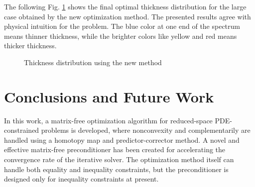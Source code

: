 \documentclass{article}
\theoremstyle{definition}
\begin{document}
The following Fig. \ref{fig:thick} shows the final optimal thickness distribution for the large case obtained by the new optimization method. The presented results agree with physical intuition for the problem. The blue color at one end of the spectrum means thinner thickness, while the brighter colors like yellow and red means thicker thickness.   

\begin{figure}[H]
\centering




\caption{Thickness distribution using the new method}
\label{fig:thick}
\end{figure}

\section{Conclusions and Future Work}
In this work, a matrix-free optimization algorithm for reduced-space PDE-constrained problems is developed, where nonconvexity and complementarily are handled using a homotopy map and predictor-corrector method. A novel and effective matrix-free preconditioner has been created for accelerating the convergence rate of the iterative solver. The optimization method itself can handle both equality and inequality constraints, but the preconditioner is designed only for inequality constraints at present. 
\end{document}
